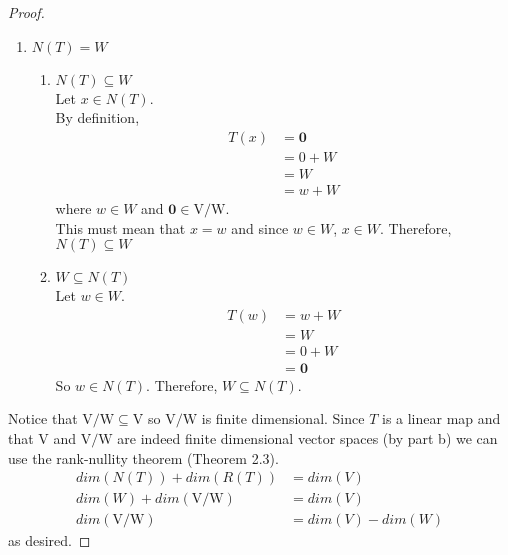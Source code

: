 \documentclass[11pt]{scrartcl}
\begin{document}
\begin{enumerate}[label=\alph*.]
{\begin{proof}
\begin{enumerate}[label=\arabic*.]
{\begin{enumerate}[label=\roman*.]
{				                  }
			            \end{enumerate}
			            }
			      \item{
			            $N(T) = W$
			            \begin{enumerate}[label=\roman*.]
				            \item{
				                  $N(T) \subseteq W$\\
				                  Let $x \in N(T)$.\\ %
				                  By definition,
				                  \begin{align*}
					                  T(x) & = \mathbf{0} \\
					                       & = 0 + W      \\
					                       & = W          \\
					                       & = w + W
				                  \end{align*}
				                  where $w \in W$ and $\mathbf{0} \in \mathrm{V}/\mathrm{W}$.\\
				                  This must mean that $x = w$ and since $w \in W$, $x \in W$. Therefore, $N(T) \subseteq W$\\
				                  }
				            \item{
				                  $W \subseteq N(T)$\\
				                  Let $w \in W$.
				                  \begin{align*}
					                  T(w) & = w + W      \\
					                       & = W          \\
					                       & = 0 + W      \\
					                       & = \mathbf{0}
				                  \end{align*}
				                  }
				                  So $w \in N(T)$. Therefore, $W \subseteq N(T)$.
			            \end{enumerate}
			            }
		      \end{enumerate}
		      Notice that $\mathrm{V}/\mathrm{W} \subseteq \mathrm{V}$
		      so $\mathrm{V}/\mathrm{W}$ is finite dimensional.
		      Since $T$ is a linear map and that $\mathrm{V}$ and $\mathrm{V}/\mathrm{W}$ are indeed finite dimensional vector spaces
		      (by part b) we can use the rank-nullity theorem (Theorem 2.3).
		      \begin{align*}
			      dim(N(T)) + dim(R(T))               & =   dim(V)        \\
			      dim(W) + dim(\mathrm{V}/\mathrm{W}) & = dim(V)          \\
			      dim(\mathrm{V}/\mathrm{W})          & = dim(V) - dim(W)
		      \end{align*}
		      as desired.
	      \end{proof}
	      }


\end{enumerate}
\end{document}
